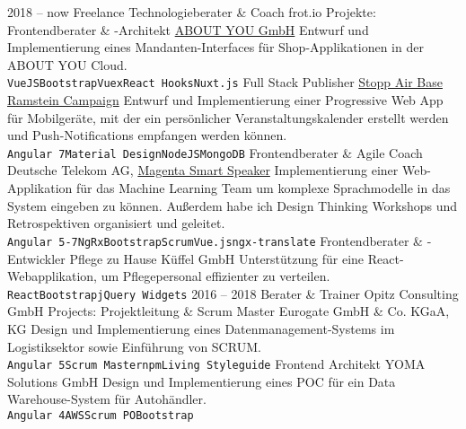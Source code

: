 \documentclass[9pt]{developercv} %
\begin{document}
\begin{entrylist}
  \entry
		{2018 -- now}
		{Freelance Technologieberater \& Coach}
		{frot.io}
    {Projekte: }
  \entry
		{}
		{Frontendberater \& -Architekt}
		{\href{https://cloud.aboutyou.com/}{ABOUT YOU GmbH}}
    {
      Entwurf und Implementierung eines Mandanten-Interfaces für Shop-Applikationen in der ABOUT YOU Cloud.\\
      \texttt{VueJS}\slashsep\texttt{Bootstrap}\slashsep\texttt{Vuex}\slashsep\texttt{React Hooks}\slashsep\texttt{Nuxt.js}
    }
	\entry
		{}
		{Full Stack Publisher}
		{\href{https://www.ramstein-kampagne.eu/}{Stopp Air Base Ramstein Campaign}}
    {
      Entwurf und Implementierung einer Progressive Web App für Mobilgeräte, mit der ein persönlicher Veranstaltungskalender
      erstellt werden und Push-Notifications empfangen werden können.\\
      \texttt{Angular 7}\slashsep\texttt{Material Design}\slashsep\texttt{NodeJS}\slashsep\texttt{MongoDB}
    }
  \entry
		{}
		{Frontendberater \& Agile Coach}
		{Deutsche Telekom AG, \href{https://www.telekom.de/zuhause/geraete-und-zubehoer/smart-speaker}{Magenta Smart Speaker}}
    {
      Implementierung einer Web-Applikation für das Machine Learning Team um komplexe Sprachmodelle in das System eingeben
      zu können. Außerdem habe ich Design Thinking Workshops und Retrospektiven organisiert und geleitet.\\
      \texttt{Angular 5-7}\slashsep\texttt{NgRx}\slashsep\texttt{Bootstrap}\slashsep\texttt{Scrum}\slashsep\texttt{Vue.js}\slashsep\texttt{ngx-translate}
    }
	\entry
		{}
		{Frontendberater \& -Entwickler}
		{Pflege zu Hause Küffel GmbH}
		{
      Unterstützung für eine React-Webapplikation, um Pflegepersonal effizienter zu verteilen.\\
      \texttt{React}\slashsep\texttt{Bootstrap}\slashsep\texttt{jQuery Widgets}
    }
  \entry
		{2016 -- 2018}
		{Berater \& Trainer}
		{Opitz Consulting GmbH}
		{
      Projects:
    }
  \entry
		{}
		{Projektleitung \& Scrum Master}
		{Eurogate GmbH \& Co. KGaA, KG}
		{
      Design und Implementierung eines Datenmanagement-Systems im Logistiksektor sowie Einführung von SCRUM.\\ 
      \texttt{Angular 5}\slashsep\texttt{Scrum Master}\slashsep\texttt{npm}\slashsep\texttt{Living Styleguide}
    }
  \entry
		{}
		{Frontend Architekt}
		{YOMA Solutions GmbH}
		{
      Design und Implementierung eines POC für ein Data Warehouse-System für Autohändler.\\
      \texttt{Angular 4}\slashsep\texttt{AWS}\slashsep\texttt{Scrum PO}\slashsep\texttt{Bootstrap}
}
\end{entrylist}
\end{document}
